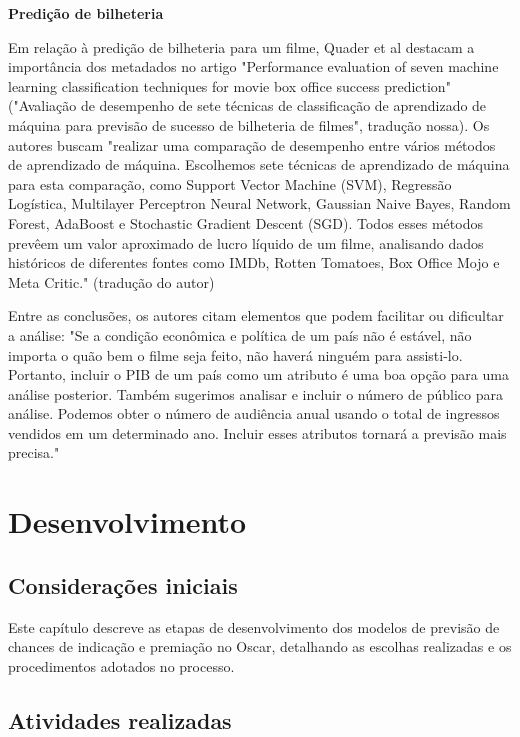         \textbf{Predição de bilheteria}\par
        Em relação à predição de bilheteria para um filme, Quader et al destacam a importância dos metadados no artigo "Performance evaluation of seven machine learning classification techniques for movie box office success prediction" ("Avaliação de desempenho de sete técnicas de classificação de aprendizado de máquina para previsão de sucesso de bilheteria de filmes", tradução nossa). Os autores buscam "realizar uma comparação de desempenho entre vários métodos de aprendizado de máquina. Escolhemos sete técnicas de aprendizado de máquina para esta comparação, como Support Vector Machine (SVM), Regressão Logística, Multilayer Perceptron Neural Network, Gaussian Naive Bayes, Random Forest, AdaBoost e Stochastic Gradient Descent (SGD). Todos esses métodos prevêem um valor aproximado de lucro líquido de um filme, analisando dados históricos de diferentes fontes como IMDb, Rotten Tomatoes, Box Office Mojo e Meta Critic." \cite{quader2017} (tradução do autor)\par
        Entre as conclusões, os autores citam elementos que podem facilitar ou dificultar a análise: "Se a condição econômica e política de um país não é estável, não importa o quão bem o filme seja feito, não haverá ninguém para assisti-lo. Portanto, incluir o PIB de um país como um atributo é uma boa opção para uma análise posterior. Também sugerimos analisar e incluir o número de público para análise. Podemos obter o número de audiência anual usando o total de ingressos vendidos em um determinado ano. Incluir esses atributos tornará a previsão mais precisa."

    \section[Desenvolvimento]{Desenvolvimento}

        \subsection{Considerações iniciais}
        Este capítulo descreve as etapas de desenvolvimento dos modelos de previsão de chances de indicação e premiação no Oscar, detalhando as escolhas realizadas e os procedimentos adotados no processo.

        \subsection{Atividades realizadas}

